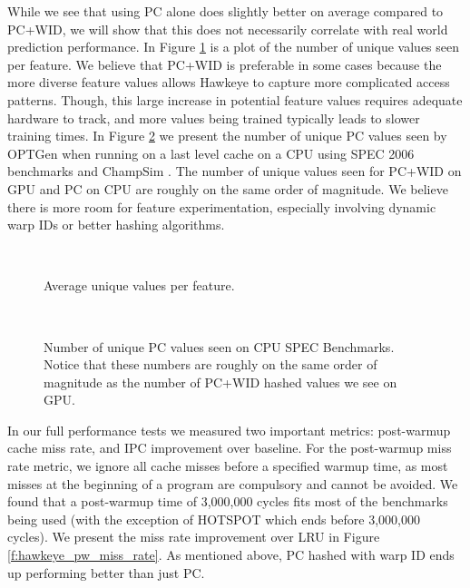 While we see that using PC alone does slightly better on average compared to PC+WID, we will show that this does not necessarily correlate with real world prediction performance. In Figure \ref{f:opt_uniq_vals} is a plot of the number of unique values seen per feature. We believe that PC+WID is preferable in some cases because the more diverse feature values allows Hawkeye to capture more complicated access patterns. Though, this large increase in potential feature values requires adequate hardware to track, and more values being trained typically leads to slower training times. In Figure \ref{f:cpu_opt_uniq_vals} we present the number of unique PC values seen by OPTGen when running on a last level cache on a CPU using SPEC 2006 \cite{spec} benchmarks and ChampSim \cite{champsim}. The number of unique values seen for PC+WID on GPU and PC on CPU are roughly on the same order of magnitude. We believe there is more room for feature experimentation, especially involving dynamic warp IDs or better hashing algorithms.


\begin{figure}[htb]
\begin{center}
\ 
\caption{Average unique values per feature.}
\label{f:opt_uniq_vals}
\end{center}
\end{figure}

\begin{figure}[htb]
\begin{center}
\ 
\caption{Number of unique PC values seen on CPU SPEC Benchmarks. Notice that these numbers are roughly on the same order of magnitude as the number of PC+WID hashed values we see on GPU.}
\label{f:cpu_opt_uniq_vals}
\end{center}
\end{figure}

In our full performance tests we measured two important metrics: post-warmup cache miss rate, and IPC improvement over baseline. For the post-warmup miss rate metric, we ignore all cache misses before a specified warmup time, as most misses at the beginning of a program are compulsory and cannot be avoided. We found that a post-warmup time of 3,000,000 cycles fits most of the benchmarks being used (with the exception of HOTSPOT which ends before 3,000,000 cycles). We present the miss rate improvement over LRU in Figure \ref{f:hawkeye_pw_miss_rate}. As mentioned above, PC hashed with warp ID ends up performing better than just PC.


